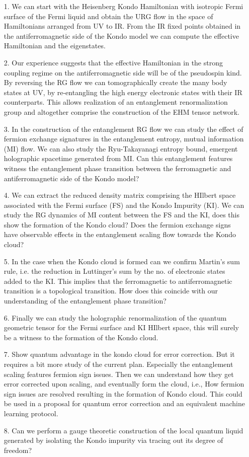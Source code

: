 \documentclass[11pt,a4paper]{article}
\begin{document}
\begin{enumerate}
\item[1.]We can start with the Heisenberg Kondo Hamiltonian with isotropic Fermi surface of the Fermi liquid and obtain the URG flow in the space of Hamiltonians arranged from UV to IR. From the IR fixed points obtained in the antiferromagnetic side of the Kondo model we can compute the effective Hamiltonian and the eigenstates.
\item[2.]Our experience suggests that the effective Hamiltonian in the strong coupling regime on the antiferromagnetic side will be of the pseudospin kind. By reversing the RG flow we can tomographically create the many body states at UV, by re-entangling the high energy electronic states with their IR counterparts. This allows realization of an entanglement renormalization group and altogether comprise the construction of the EHM tensor network.
\item[3.]In the construction of the entanglement RG flow we can study the effect of fermion exchange signatures in the entanglement entropy, mutual information (MI) flow. We can also study the Ryu-Takayanagi entropy bound, emergent holographic spacetime generated from MI. Can this entanglement features witness the entanglement phase transition between the ferromagnetic and antiferromagnetic side of the Kondo model?
\item[4.]We can extract the reduced density matrix comprising the HIlbert space associated with the Fermi surface (FS) and the Kondo Impurity (KI). We can study the RG dynamics of MI content between the FS and the KI, does this show the formation of the Kondo cloud? Does the fermion exchange signs have observable effects in the entanglement scaling flow towards the Kondo cloud?
\item[5.]In the case when the Kondo cloud is formed can we confirm Martin’s sum rule, i.e. the reduction in Luttinger’s sum by the no. of electronic states added to the KI. This implies that the ferromagnetic to antiferromagnetic transition is a topological transition. How does this coincide with our understanding of the entanglement phase transition?
\item[6.]Finally we can study the holographic renormalization of the quantum geometric tensor for the Fermi surface and KI HIlbert space, this will surely be a witness to the formation of the Kondo cloud.
\item[7.]Show quantum advantage in the kondo cloud for error correction. But it requires a bit more study of the current plan. Especially the entanglement scaling features fermion sign issues. Then we can understand how they get error corrected upon scaling, and eventually form the cloud, i.e., How fermion sign issues are resolved resulting in the formation of Kondo cloud. This could be used in a proposal for quantum error correction and an equivalent machine learning protocol.
\item[8.]Can we perform a gauge theoretic construction of the local quantum liquid generated by isolating the Kondo impurity via tracing out its degree of freedom?
\end{enumerate}
\end{document}
